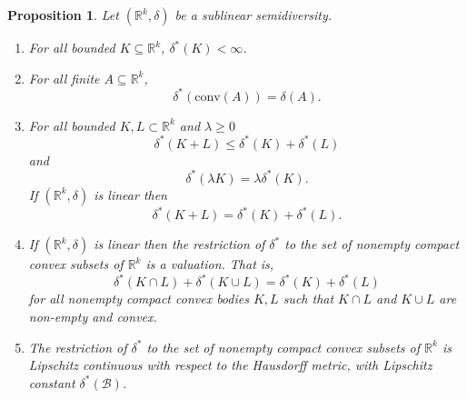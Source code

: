 \documentclass[11pt]{article}
\newtheorem{proposition}[theorem]{Proposition}
\newcommand{\conv}{\mathrm{conv}}
\renewcommand{\Re}{\mathbb{R}}
\newcommand{\sB}{\mathcal{B}}
\begin{document}
    
\begin{proposition} \label{prop:dstar}
Let $(\Re^k,\delta)$ be a sublinear semidiversity. 
\begin{enumerate}
\item For all bounded $K \subseteq \Re^k$, $\delta^*(K) < \infty$.
\item For all finite $A \subseteq \Re^k$,
\[ \delta^*(\conv(A)) = \delta(A). \]
\item For all bounded $K,L \subset \Re^k$ and $\lambda \geq 0$
\[ \delta^*(K+L) \leq \delta^*(K) + \delta^*(L) \]
and
\[ \delta^*(\lambda K) = \lambda \delta^*(K).\]
If $(\Re^k,\delta)$ is linear then
\[ \delta^*(K+L) = \delta^*(K) + \delta^*(L).\]
\item If $(\Re^k,\delta)$ is linear then the restriction of $\delta^*$ to the set of nonempty compact convex subsets of $\Re^k$ is a valuation. That is,
\[\delta^*(K \cap L) + \delta^*(K \cup L) = \delta^*(K) + \delta^*(L)\]
for all nonempty compact convex bodies $K,L$ such that $K \cap L$ and $K \cup L$ are non-empty and convex.
\item The restriction of $\delta^*$ to the set of nonempty compact convex subsets of $\Re^k$ is Lipschitz continuous with respect to the Hausdorff metric, with Lipschitz constant $\delta^*(\sB)$.
\end{enumerate}
\end{proposition}
\end{document}
